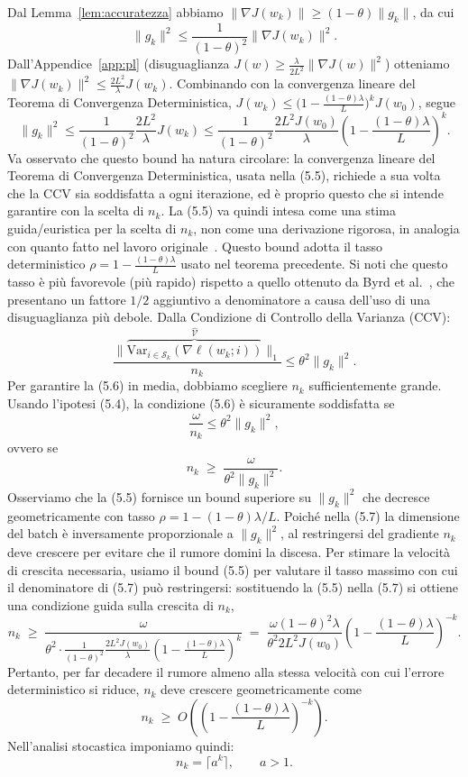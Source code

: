 \documentclass[italian, a4paper, twoside, binding=6mm]{sapthesis}
\begin{document}
Dal Lemma~\ref{lem:accuratezza} abbiamo $\|\nabla J(w_k)\|\ge(1-\theta)\|g_k\|$,
da cui
\[
\|g_k\|^2\le\frac{1}{(1-\theta)^2}\|\nabla J(w_k)\|^2.
\]
Dall'Appendice~\ref{app:pl} (disuguaglianza $J(w)\ge\frac{\lambda}{2L^2}\|\nabla J(w)\|^2$)
otteniamo $\|\nabla J(w_k)\|^2\le\frac{2L^2}{\lambda}J(w_k)$.
Combinando con la convergenza lineare del Teorema di Convergenza Deterministica,
$J(w_k)\le\bigl(1-\frac{(1-\theta)\lambda}{L}\bigr)^k J(w_0)$, segue
\[
\|g_k\|^2\le\frac{1}{(1-\theta)^2}\frac{2L^2}{\lambda}J(w_k)
\le\frac{1}{(1-\theta)^2}\frac{2L^2 J(w_0)}{\lambda}
\left(1-\frac{(1-\theta)\lambda}{L}\right)^k.
\tag{5.5}\label{eq:bound_gk}
\]
Va osservato che questo bound ha natura circolare: la convergenza lineare del Teorema di Convergenza Deterministica, usata nella (5.5), richiede a sua volta che la CCV sia soddisfatta a ogni iterazione, ed è proprio questo che si intende garantire con la scelta di $n_k$. La (5.5) va quindi intesa come una stima guida/euristica per la scelta di $n_k$, non come una derivazione rigorosa, in analogia con quanto fatto nel lavoro originale~\cite{byrd2012}.
Questo bound adotta il tasso deterministico $\rho=1-\frac{(1-\theta)\lambda}{L}$ usato nel teorema precedente.  Si noti che questo tasso è più favorevole (più rapido) rispetto a quello ottenuto da Byrd et al.~\cite{byrd2012}, che presentano un fattore $1/2$ aggiuntivo a denominatore a causa dell'uso di una disuguaglianza più debole.
Dalla Condizione di Controllo della Varianza (CCV):
\[
\frac{\|\overbrace{\mathrm{Var}_{i\in\mathcal{S}_k}(\nabla \ell(w_k;i))}^{\widehat{\mathcal{V}}}\|_1}{n_k} \le \theta^2 \|g_k\|^2. \tag{5.6}\]
Per garantire la (5.6) in media, dobbiamo scegliere \(n_k\) sufficientemente grande. Usando l'ipotesi (5.4), la condizione (5.6) è sicuramente soddisfatta se
\[
\frac{\omega}{n_k} \le \theta^2 \|g_k\|^2,
\]
ovvero se
\[
n_k \;\ge\; \frac{\omega}{\theta^2 \|g_k\|^2}. \tag{5.7}
\]
Osserviamo che la (5.5) fornisce un bound superiore su \(\|g_k\|^2\) che decresce geometricamente con tasso \(\rho = 1-(1-\theta)\lambda/L\). Poiché nella (5.7) la dimensione del batch è inversamente proporzionale a \(\|g_k\|^2\), al restringersi del gradiente \(n_k\) deve crescere per evitare che il rumore domini la discesa. Per stimare la velocità di crescita necessaria, usiamo il bound (5.5) per valutare il tasso massimo con cui il denominatore di (5.7) può restringersi: sostituendo la (5.5) nella (5.7) si ottiene una condizione guida sulla crescita di \(n_k\),
\[
n_k \;\ge\; \frac{\omega}{\theta^2 \cdot \frac{1}{(1-\theta)^2}\frac{2L^2 J(w_0)}{\lambda}\left(1 - \frac{(1-\theta)\lambda}{L}\right)^k}
\;=\; \frac{\omega (1-\theta)^2 \lambda}{\theta^2 2L^2 J(w_0)}
\left(1 - \frac{(1-\theta)\lambda}{L}\right)^{-k}. \tag{5.8}
\]
Pertanto, per far decadere il rumore almeno alla stessa velocità con cui l'errore deterministico si riduce, \(n_k\) deve crescere geometricamente come
\[
n_k \;\ge\; O\!\left(\left(1 - \frac{(1-\theta)\lambda}{L}\right)^{-k}\right).
\]
Nell'analisi stocastica imponiamo quindi:
\[
n_k = \lceil a^k \rceil, \qquad a > 1. \tag{5.9}
\]
\end{document}
